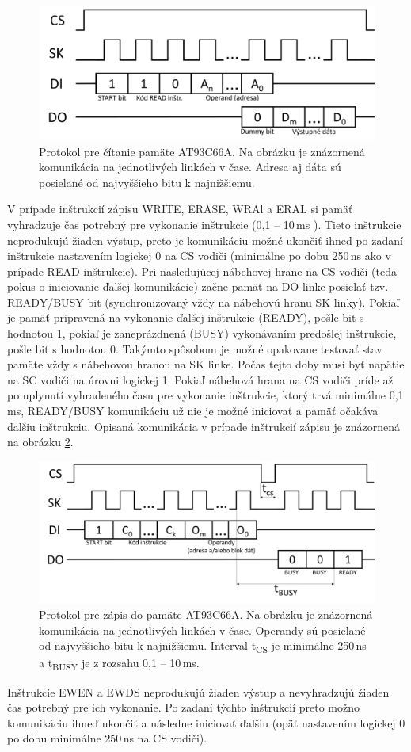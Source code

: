 \begin{figure}
    \centerline{\includegraphics[width=1\textwidth]{images/eepromREAD.png}}
    \caption[Protokol pre čítanie pamäte AT93C66A]{Protokol pre čítanie pamäte AT93C66A. Na obrázku je znázornená komunikácia na jednotlivých linkách v čase. Adresa aj dáta sú posielané od najvyššieho bitu k najnižšiemu.}
    \label{obr:eepromREAD}
\end{figure}

V prípade inštrukcií zápisu WRITE, ERASE, WRAl a ERAL si pamäť vyhradzuje čas potrebný pre vykonanie inštrukcie (0,1 -- 10\,ms \cite{eepromDatasheet}). Tieto inštrukcie neprodukujú žiaden výstup, preto je komunikáciu možné ukončiť ihneď po zadaní inštrukcie nastavením logickej 0 na CS vodiči (minimálne po dobu 250\,ns ako v prípade READ inštrukcie). Pri nasledujúcej nábehovej hrane na CS vodiči (teda pokus o iniciovanie ďalšej komunikácie) začne pamäť na DO linke posielať tzv. READY/BUSY bit (synchronizovaný vždy na nábehovú hranu SK linky). Pokiaľ je pamäť pripravená na vykonanie ďalšej inštrukcie (READY), pošle bit s hodnotou 1, pokiaľ je zaneprázdnená (BUSY) vykonávaním predošlej inštrukcie, pošle bit s hodnotou 0. Takýmto spôsobom je možné opakovane testovať stav pamäte vždy s nábehovou hranou na SK linke. Počas tejto doby musí byť napätie na SC vodiči na úrovni logickej 1. Pokiaľ nábehová hrana na CS vodiči príde až po uplynutí vyhradeného času pre vykonanie inštrukcie, ktorý trvá minimálne 0,1\,ms, READY/BUSY komunikáciu už nie je možné iniciovať a pamäť očakáva ďalšiu inštrukciu. Opisaná komunikácia v prípade inštrukcií zápisu je znázornená na obrázku \ref{obr:eepromWRITE}.

\begin{figure}[h!]
    \centerline{\includegraphics[width=1\textwidth]{images/eepromWRITE.png}}
    \caption[Protokol pre zápis do pamäte AT93C66A]{Protokol pre zápis do pamäte AT93C66A. Na obrázku je znázornená komunikácia na jednotlivých linkách v čase. Operandy sú posielané od najvyššieho bitu k najnižšiemu. Interval t\textsubscript{CS} je minimálne 250\,ns a t\textsubscript{BUSY} je z rozsahu 0,1 -- 10\,ms.}
    \label{obr:eepromWRITE}
\end{figure}

Inštrukcie EWEN a EWDS neprodukujú žiaden výstup a nevyhradzujú žiaden čas potrebný pre ich vykonanie. Po zadaní týchto inštrukcií preto možno komunikáciu ihneď ukončiť a následne iniciovať ďalšiu (opäť nastavením logickej 0 po dobu minimálne 250\,ns na CS vodiči).